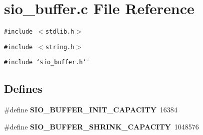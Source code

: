 \section{sio\_\-buffer.c File Reference}
\label{sio__buffer_8c}
{\tt \#include $<$stdlib.h$>$}\par
{\tt \#include $<$string.h$>$}\par
{\tt \#include \char`\"{}sio\_\-buffer.h\char`\"{}}\par
\subsection*{Defines}
\begin{CompactItemize}
\item 
\#define {\bf SIO\_\-BUFFER\_\-INIT\_\-CAPACITY}\ 16384\label{sio__buffer_8c_a0}

\item 
\#define {\bf SIO\_\-BUFFER\_\-SHRINK\_\-CAPACITY}\ 1048576\label{sio__buffer_8c_a1}

\end{CompactItemize}
